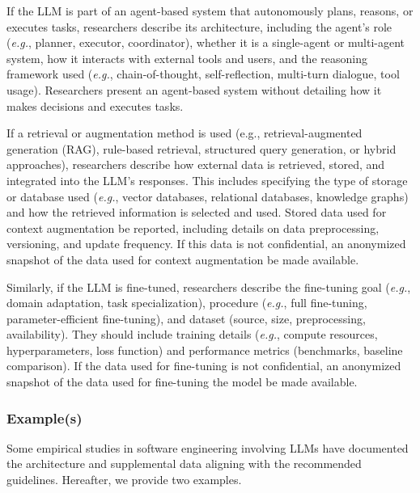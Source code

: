 
If the LLM is part of an agent-based system that autonomously plans, reasons, or executes tasks, researchers \must describe its architecture, including the agent's role (\textit{e.g.}, planner, executor, coordinator), whether it is a single-agent or multi-agent system, how it interacts with external tools and users, and the reasoning framework used (\textit{e.g.}, chain-of-thought, self-reflection, multi-turn dialogue, tool usage). Researchers \mustnot present an agent-based system without detailing how it makes decisions and executes tasks.


If a retrieval or augmentation method is used (e.g., retrieval-augmented generation (RAG), rule-based retrieval, structured query generation, or hybrid approaches), researchers \must describe how external data is retrieved, stored, and integrated into the LLM's responses. This includes specifying the type of storage or database used (\textit{e.g.}, vector databases, relational databases, knowledge graphs) and how the retrieved information is selected and used. Stored data used for context augmentation \must be reported, including details on data preprocessing, versioning, and update frequency. If this data is not confidential, an anonymized snapshot of the data used for context augmentation \should be made available.

Similarly, if the LLM is fine-tuned, researchers \must describe the fine-tuning goal (\textit{e.g.}, domain adaptation, task specialization), procedure (\textit{e.g.}, full fine-tuning, parameter-efficient fine-tuning), and dataset (source, size, preprocessing, availability). They should include training details (\textit{e.g.}, compute resources, hyperparameters, loss function) and performance metrics (benchmarks, baseline comparison). If the data used for fine-tuning is not confidential, an anonymized snapshot of the data used for fine-tuning the model \should be made available.

\subsubsection{Example(s)}

Some empirical studies in software engineering involving LLMs have documented the architecture and supplemental data aligning with the recommended guidelines. Hereafter, we provide two examples.


